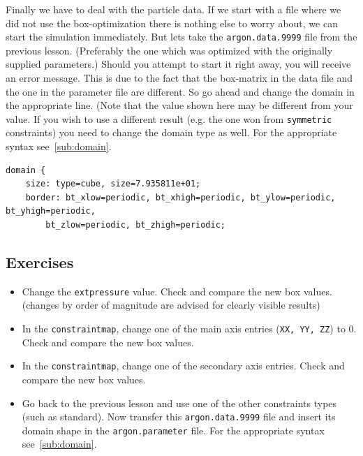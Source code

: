 Finally we have to deal with the particle data. If we start with a file where we did not use the box-optimization there is nothing else to worry about, we can start
the simulation immediately. But lets take the \texttt{argon.data.9999} file from the previous lesson. (Preferably the one which was optimized with the originally supplied parameters.) Should you attempt to start it right away, you will receive an error
message. This is due to the fact that the box-matrix in the data file and the one in the parameter file are different. So go ahead and change the domain in the
appropriate line.  (Note that the value shown here may be different from your value. If you wish to use a different result (e.g. the one won from \texttt{symmetric}
constraints) you need to change the domain type as well. For the appropriate syntax see~\ref{sub:domain}.

\begin{lstlisting}
domain {
    size: type=cube, size=7.935811e+01;
    border: bt_xlow=periodic, bt_xhigh=periodic, bt_ylow=periodic, bt_yhigh=periodic,
        bt_zlow=periodic, bt_zhigh=periodic;
\end{lstlisting}


\subsection{Exercises}
\begin{itemize}
 \item Change the \texttt{extpressure} value. Check and compare the new box values. (changes by order of magnitude are advised for clearly visible results) 
 \item In the \texttt{constraintmap}, change one of the main axis entries (\texttt{XX, YY, ZZ}) to 0. Check and compare the new box values. 
 \item In the \texttt{constraintmap}, change one of the secondary axis entries. Check and compare the new box values. 
 \item Go back to the previous lesson and use one of the other constraints types (such as standard). Now transfer this \texttt{argon.data.9999} file and insert
 its domain shape in the \texttt{argon.parameter} file. For the appropriate syntax see~\ref{sub:domain}.
\end{itemize}

